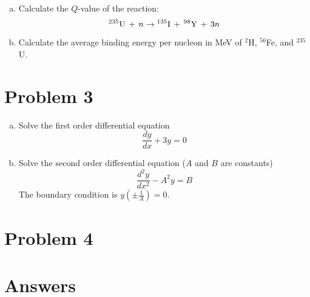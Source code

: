 \documentclass{report}
\begin{document}
\begin{enumerate}[a)]
\item Calculate the $Q$-value of the reaction:
$$ ^{235}\text{U}\, + \,n \-\rightarrow\- ^{135}\text{I}\, + \,^{98}\text{Y}\, + \,3n $$
\item Calculate the average binding energy per nucleon in MeV of $^{2}$H, $^{56}$Fe, and $^{235}$U.

\end{enumerate}


\newpage
\section*{Problem 3}

\begin{enumerate}[a)]
\item Solve the first order differential equation
$$ \frac{dy}{dx} + 3y = 0 $$
\item Solve the second order differential equation ($A$ and $B$ are constants)
$$ \frac{d^2 y}{dx^2} - A^2y = B $$
The boundary condition is $y(\pm\frac{1}{A}) = 0$.
\end{enumerate}


\newpage
\section*{Problem 4}




\newpage
\section*{Answers}
\end{document}
